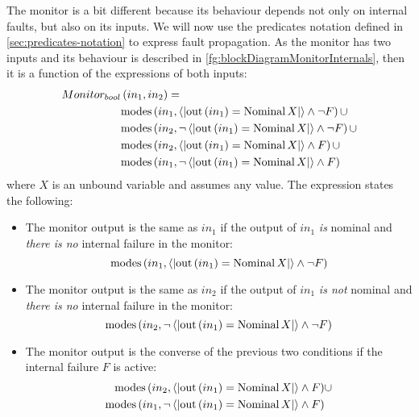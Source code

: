 The monitor is a bit different because its behaviour depends not only on internal faults, but also on its inputs. 
We will now use the predicates notation defined in \cref{sec:predicates-notation} to express fault propagation.
As the monitor has two inputs and its behaviour is described in \cref{fg:blockDiagramMonitorInternals}, then it is a function of the expressions of both inputs:
%
\begin{equation}
\label{eq:monitor-bool}
\begin{split}
Monitor_{bool} &\left(in_1, in_2\right) = \\
  & \mathrm{modes}\left(in_1,\left\langle\left| \mathrm{out}\left(in_1\right) = \mathop{\mathrm{Nominal}} X \right|\right\rangle \land \lnot F\right) \cup\\
  & \mathrm{modes}\left(in_2,\lnot \left\langle\left| \mathrm{out}\left(in_1\right) = \mathop{\mathrm{Nominal}} X \right|\right\rangle \land \lnot F\right) \cup\\
  & \mathrm{modes}\left(in_2,\left\langle\left| \mathrm{out}\left(in_1\right) = \mathop{\mathrm{Nominal}} X \right|\right\rangle \land F\right) \cup\\
  & \mathrm{modes}\left(in_1,\lnot \left\langle\left| \mathrm{out}\left(in_1\right) = \mathop{\mathrm{Nominal}} X \right|\right\rangle \land F\right)
\end{split}
\end{equation}
where $X$ is an unbound variable and assumes any value.
%
The expression states the following:
\begin{itemize}
  \item The monitor output is the same as $in_1$ if the output of $in_1$ \emph{is} nominal and \emph{there is no} internal failure in the monitor:
  \[
  \mathrm{modes}\left(in_1,\left\langle\left| \mathrm{out}\left(in_1\right) = \mathop{\mathrm{Nominal}} X \right|\right\rangle \land \lnot F\right)
  \]
  \item The monitor output is the same as $in_2$ if the output of $in_1$ \emph{is not} nominal and \emph{there is no} internal failure in the monitor:
  \[
  \mathrm{modes}\left(in_2,\lnot \left\langle\left| \mathrm{out}\left(in_1\right) = \mathop{\mathrm{Nominal}} X \right|\right\rangle \land \lnot F\right)
  \]
  \item The monitor output is the converse of the previous two conditions if the internal failure $F$ is active:
  \[
  \begin{split}
  \mathrm{modes}\left(in_2,\left\langle\left| \mathrm{out}\left(in_1\right) = \mathop{\mathrm{Nominal}} X \right|\right\rangle \land F\right) &\cup\\
  \mathrm{modes}\left(in_1,\lnot \left\langle\left| \mathrm{out}\left(in_1\right) = \mathop{\mathrm{Nominal}} X \right|\right\rangle \land F\right) &
  \end{split}
  \]
\end{itemize}

